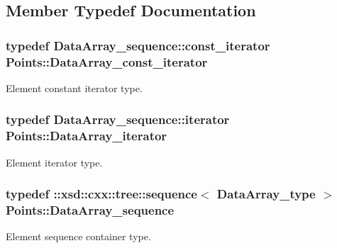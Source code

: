 \subsection{Member Typedef Documentation}
\hypertarget{classPoints_a795a395909c3360569fe0e854ba6059e}{}
\subsubsection[{Data\+Array\+\_\+const\+\_\+iterator}]{\setlength{\rightskip}{0pt plus 5cm}typedef Data\+Array\+\_\+sequence\+::const\+\_\+iterator {\bf Points\+::\+Data\+Array\+\_\+const\+\_\+iterator}}\label{classPoints_a795a395909c3360569fe0e854ba6059e}


Element constant iterator type. 

\hypertarget{classPoints_ac4cd7a177b464c1e08d493600a7e6e16}{}
\subsubsection[{Data\+Array\+\_\+iterator}]{\setlength{\rightskip}{0pt plus 5cm}typedef Data\+Array\+\_\+sequence\+::iterator {\bf Points\+::\+Data\+Array\+\_\+iterator}}\label{classPoints_ac4cd7a177b464c1e08d493600a7e6e16}


Element iterator type. 

\hypertarget{classPoints_ac8b51dcf0e7659ca61ff9b9d24051016}{}
\subsubsection[{Data\+Array\+\_\+sequence}]{\setlength{\rightskip}{0pt plus 5cm}typedef \+::xsd\+::cxx\+::tree\+::sequence$<$ {\bf Data\+Array\+\_\+type} $>$ {\bf Points\+::\+Data\+Array\+\_\+sequence}}\label{classPoints_ac8b51dcf0e7659ca61ff9b9d24051016}


Element sequence container type. 

\hypertarget{classPoints_a815b88c9204c7251f4a08c6769645ef1}{}
